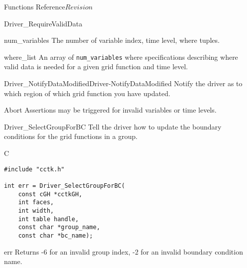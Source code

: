 \begin{cactuspart}{ Functions Reference}{}{$Revision$}
\begin{FunctionDescription}{Driver\_RequireValidData}
\begin{ParameterSection}
\begin{Parameter}{num\_variables}
The number of variable index, time level, where tuples.
\end{Parameter}
\end{ParameterSection}

\begin{ParameterSection}
\begin{Parameter}{where\_list}
An array of \texttt{num\_variables} where specifications describing
where valid data is needed for a given grid function and time level.
\end{Parameter}
\end{ParameterSection}

\begin{SeeAlsoSection}
\begin{SeeAlso2}{Driver\_NotifyDataModified}{Driver-NotifyDataModified}
Notify the driver as to which region of which grid function you have updated.
\end{SeeAlso2}
\end{SeeAlsoSection}

\begin{ErrorSection}
\begin{Error}{Abort}
Assertions may be triggered for invalid variables or time levels.
\end{Error}
\end{ErrorSection}
\end{FunctionDescription}

\begin{FunctionDescription}{Driver\_SelectGroupForBC}
\label{Driver-SelectGroupForBC}
Tell the driver how to update the boundary conditions for the grid functions in a group.
\begin{SynopsisSection}
\begin{Synopsis}{C}
\begin{verbatim}
#include "cctk.h"

int err = Driver_SelectGroupForBC(
    const cGH *cctkGH,
    int faces,
    int width,
    int table handle,
    const char *group_name,
    const char *bc_name);

\end{verbatim}
\end{Synopsis}
\end{SynopsisSection}

\begin{ResultSection}
\begin{Result}{err}
Returns -6 for an invalid group index, -2 for an invalid boundary condition name.
\end{Result}
\end{ResultSection}


\end{FunctionDescription}
\end{cactuspart}

